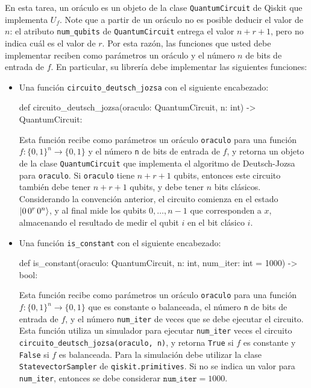 \documentclass[10pt]{article}
\begin{document}
\begin{enumerate}
  En esta tarea, un oráculo es un objeto de la clase \texttt{QuantumCircuit} de Qiskit que
  implementa $U_f$. Note que a partir de un oráculo no es posible deducir el valor de $n$: el
  atributo \texttt{num\_qubits} de \texttt{QuantumCircuit} entrega el valor $n + r + 1$, pero no
  indica cuál es el valor de $r$. Por esta razón, las funciones que usted debe implementar reciben
  como parámetros un oráculo y el número $n$ de bits de entrada de $f$. En particular, su librería
  debe implementar las siguientes funciones:
  \begin{itemize}
  \item Una función \texttt{circuito\_deutsch\_jozsa} con el siguiente encabezado:
\begin{python}
def circuito_deutsch_jozsa(oraculo: QuantumCircuit, n: int) -> QuantumCircuit:
\end{python}
    Esta función recibe como parámetros un oráculo \texttt{oraculo} para una función
    $f : \{0,1\}^n \to \{0,1\}$ y el número \texttt{n} de bits de entrada de $f$, y retorna un
    objeto de la clase \texttt{QuantumCircuit} que implementa el algoritmo de Deutsch-Jozsa para
    \texttt{oraculo}. Si \texttt{oraculo} tiene $n + r + 1$ qubits, entonces este circuito también
    debe tener $n + r + 1$ qubits, y debe tener $n$ bits clásicos. Considerando la convención
    anterior, el circuito comienza en el estado $\ket{0\, 0^r\, 0^n}$, y al final mide los qubits $0, \ldots, n-1$ que corresponden a $x$,
    almacenando el resultado de medir el qubit $i$ en el bit clásico $i$.
  \item Una función \texttt{is\_constant} con el siguiente encabezado:
\begin{python}
def is_constant(oraculo: QuantumCircuit, n: int, num_iter: int = 1000) -> bool:
\end{python}
    Esta función recibe como parámetros un oráculo \texttt{oraculo} para una función
    $f : \{0,1\}^n \to \{0,1\}$ que es constante o balanceada, el número \texttt{n} de bits de
    entrada de $f$, y el número \texttt{num\_iter} de veces que se debe ejecutar el circuito. Esta
    función utiliza un simulador para ejecutar \texttt{num\_iter} veces el circuito
    \texttt{circuito\_deutsch\_jozsa(oraculo, n)}, y retorna \texttt{True} si $f$ es constante y \texttt{False} si $f$ es
    balanceada. Para la simulación debe utilizar la clase \texttt{StatevectorSampler} de
    \texttt{qiskit.primitives}. Si no se indica un valor para \texttt{num\_iter}, entonces se debe
    considerar $\texttt{num\_iter} = 1000$.
  \end{itemize}


\end{enumerate}
\end{document}
